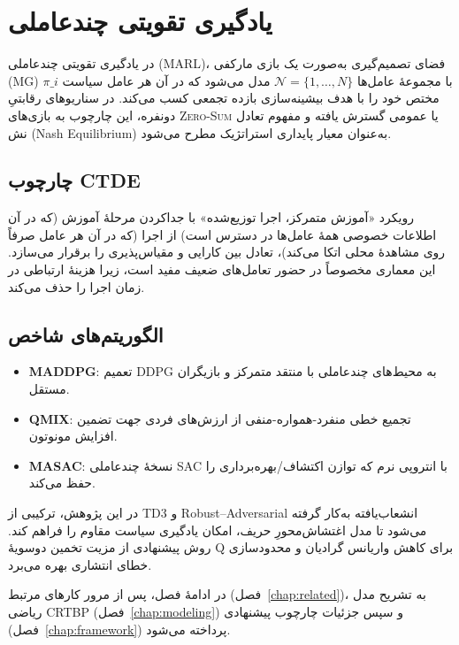     
    \section{یادگیری تقویتی چندعاملی}\label{sec:marl}
    
    در یادگیری تقویتی چندعاملی ({MARL})، فضای تصمیم‌گیری به‌صورت یک بازی مارکفی ({MG}) با مجموعهٔ عامل‌ها {$\mathcal{N}=\{1,\dots,N\}$} مدل می‌شود که در آن هر عامل سیاست {$\pi\_i$} مختص خود را با هدف بیشینه‌سازی بازده تجمعی کسب می‌کند. در سناریوهای رقابتیِ دونفره، این چارچوب به بازی‌های \textsc{Zero-Sum} یا عمومی گسترش یافته و مفهوم تعادل نش (Nash Equilibrium) به‌عنوان معیار پایداری استراتژیک مطرح می‌شود.
    
    \subsection*{چارچوب CTDE}
    رویکرد {«آموزش متمرکز، اجرا توزیع‌شده»} \cite{lowe2017multi} با جداکردن مرحلهٔ آموزش (که در آن اطلاعات خصوصی همهٔ عامل‌ها در دسترس است) از اجرا (که در آن هر عامل صرفاً روی مشاهدهٔ محلی اتکا می‌کند)، تعادل بین کارایی و مقیاس‌پذیری را برقرار می‌سازد. این معماری مخصوصاً در حضور تعامل‌های ضعیف مفید است، زیرا هزینهٔ ارتباطی در زمان اجرا را حذف می‌کند.
    
    \subsection*{الگوریتم‌های شاخص}
    \begin{itemize}
    	\item \textbf{MADDPG}: تعمیم DDPG به محیط‌های چندعاملی با منتقد متمرکز و بازیگران مستقل.
    	\item \textbf{QMIX}: تجمیع خطی منفرد-همواره-منفی از ارزش‌های فردی جهت تضمین افزایش مونوتون.
    	\item \textbf{MASAC}: نسخهٔ چندعاملی SAC با انتروپی نرم که توازن اکتشاف/بهره‌برداری را حفظ می‌کند.
    \end{itemize}
    
    در این پژوهش، ترکیبی از TD3 و {Robust–Adversarial} انشعاب‌یافته به‌کار گرفته می‌شود تا مدل اغتشاش‌محورِ حریف، امکان یادگیری سیاست مقاوم را فراهم کند. روش پیشنهادی از مزیت تخمین دوسویهٔ Q برای کاهش واریانس گرادیان و محدودسازی خطای انتشاری بهره می‌برد.
    
    \vspace{1em}
    در ادامهٔ فصل، پس از مرور کارهای مرتبط (فصل~\ref{chap:related})، به تشریح مدل ریاضی CRTBP (فصل~\ref{chap:modeling}) و سپس جزئیات چارچوب پیشنهادی (فصل~\ref{chap:framework}) پرداخته می‌شود.
    